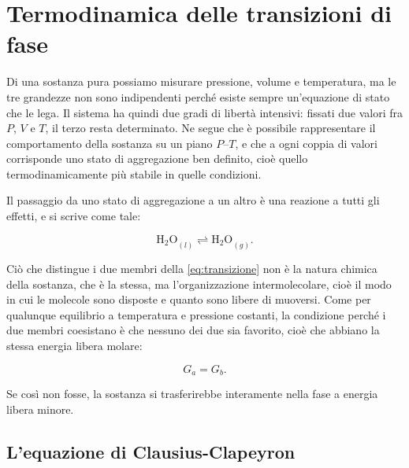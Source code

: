 \chapter{Termodinamica delle transizioni di fase}
 
Di una sostanza pura possiamo misurare pressione, volume e temperatura, ma le tre grandezze non sono indipendenti perché esiste sempre un'equazione di stato che le lega.
Il sistema ha quindi due gradi di libertà intensivi: fissati due valori fra $P$, $V$ e $T$, il terzo resta determinato.
Ne segue che è possibile rappresentare il comportamento della sostanza su un piano $P$--$T$, e che a ogni coppia di valori corrisponde uno stato di aggregazione ben definito, cioè quello termodinamicamente più stabile in quelle condizioni.
 
Il passaggio da uno stato di aggregazione a un altro è una reazione a tutti gli effetti, e si scrive come tale:

\begin{equation}
    \mathrm{H_2O}_{(l)} \rightleftharpoons \mathrm{H_2O}_{(g)} .
    \label{eq:transizione}
\end{equation}

Ciò che distingue i due membri della \eqref{eq:transizione} non è la natura chimica della sostanza, che è la stessa, ma l'organizzazione intermolecolare, cioè il modo in cui le molecole sono disposte e quanto sono libere di muoversi.
Come per qualunque equilibrio a temperatura e pressione costanti, la condizione perché i due membri coesistano è che nessuno dei due sia favorito, cioè che abbiano la stessa energia libera molare:

\begin{equation}
    G_a = G_b .
    \label{eq:uguaglianza_G}
\end{equation}

Se così non fosse, la sostanza si trasferirebbe interamente nella fase a energia libera minore.
 
\section{L'equazione di Clausius-Clapeyron}
 

